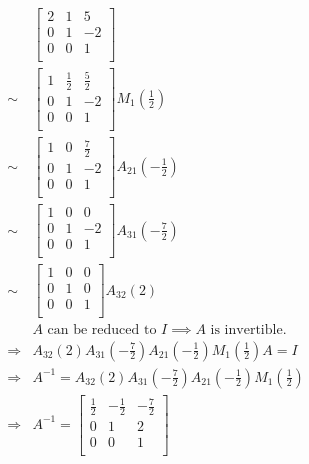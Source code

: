 \documentclass{article}
\begin{document}
\begin{equation*}
    \begin{split}
        &\begin{bmatrix}
            2&1&5\\
            0&1&-2\\
            0&0&1\\
        \end{bmatrix}\\
        \sim&\begin{bmatrix}
            1&\frac{1}{2}&\frac{5}{2}\\
            0&1&-2\\
            0&0&1\\
        \end{bmatrix}M_{1}(\frac{1}{2})\\
        \sim&\begin{bmatrix}
            1&0&\frac{7}{2}\\
            0&1&-2\\
            0&0&1\\
        \end{bmatrix}A_{21}(-\frac{1}{2})\\
        \sim&\begin{bmatrix}
            1&0&0\\
            0&1&-2\\
            0&0&1\\
        \end{bmatrix}A_{31}(-\frac{7}{2})\\
        \sim&\begin{bmatrix}
            1&0&0\\
            0&1&0\\
            0&0&1\\
        \end{bmatrix}A_{32}(2)\\
        &A\text{ can be reduced to }I\implies A\text{ is invertible}.\\
        \Rightarrow& A_{32}(2)A_{31}(-\frac{7}{2})A_{21}(-\frac{1}{2})M_{1}(\frac{1}{2})A=I\\
        \Rightarrow&A^{-1}=A_{32}(2)A_{31}(-\frac{7}{2})A_{21}(-\frac{1}{2})M_{1}(\frac{1}{2})\\
        \Rightarrow&A^{-1}=\begin{bmatrix}
            \frac{1}{2}&-\frac{1}{2}&-\frac{7}{2}\\
            0&1&2\\
            0&0&1\\
        \end{bmatrix}\\
    \end{split}
\end{equation*}
\end{document}
